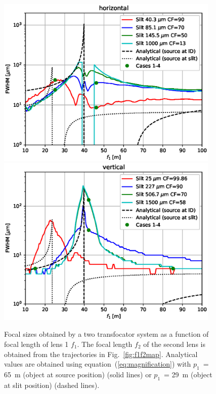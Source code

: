 \documentclass{iucr}              %
\newcommand{\ingreen}[1]{{\color{green}#1}}
\begin{document}
\begin{figure}
    \centering
    
    \includegraphics[width=0.95\textwidth]{figures/sizes_h.eps}
    \includegraphics[width=0.95\textwidth]{figures/sizes_v.eps}
        
    \caption{Focal sizes obtained by a two transfocator system as a function of focal length of lens 1 $f_1$. The focal length $f_2$ of the second lens is obtained from the trajectories in Fig.~\ref{fig:f1f2map}. 
    Analytical values are obtained using equation~(\ref{eq:magnification}) with $p_1$~= \SI{65}{\meter} (object at source position) (solid lines) or $p_1$~= \SI{29}{\meter} (object at slit position) (dashed lines). 
    }
    \label{fig:focalSizes}
\end{figure}
\end{document}
